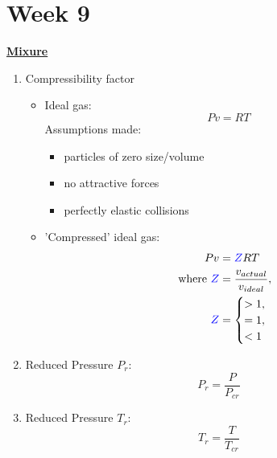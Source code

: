 \section{Week 9}
\Large \textbf{{\color{red}\underline{Mixure}}}

\begin{enumerate}
    \item Compressibility factor
    \begin{itemize}
        \item Ideal gas: 
        \begin{equation*}
            Pv = RT
        \end{equation*}
        Assumptions made:
        \begin{itemize}
            \item particles of zero size/volume
            \item no attractive forces
            \item perfectly elastic collisions
        \end{itemize}
        \item 'Compressed' ideal gas:
        \begin{align*}
            Pv &= {\color{blue}Z}RT\\
            \text{where } {\color{blue}Z} &= \frac{v_{actual}}{v_{ideal}}, \\
            {\color{blue}Z} &= \begin{cases} 
            >1, \\
            =1, \\
            < 1
            \end{cases}
        \end{align*}
    \end{itemize}
    \item {\color{blue}Reduced Pressure $P_r$}:
    \begin{equation*}
        P_r = \frac{P}{P_{cr}}
    \end{equation*}
    \item {\color{blue}Reduced Pressure $T_r$}:
    \begin{equation*}
        T_r = \frac{T}{T_{cr}}
    \end{equation*}
\end{enumerate}

